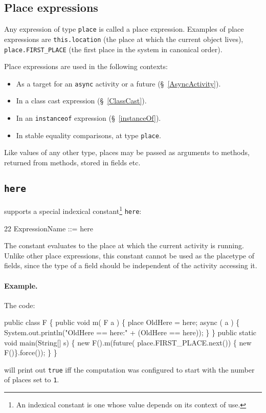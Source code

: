 \cbend
\subsection{Place expressions}
Any expression of type {\tt place} is called a place expression. 
Examples of place expressions are {\tt this.location} (the place
at which the current object lives), {\tt place.FIRST\_PLACE}
(the first place in the system in canonical order). 

Place expressions are used in the following contexts: 
\begin{itemize}
\item As a target for an {\tt async} activity or a future
(\S~\ref{AsyncActivity}).
\item In a class cast expression  (\S~\ref{ClassCast}).
\item In an {\tt instanceof} expression (\S~\ref{instanceOf}).
\item In stable equality comparisons, at type {\tt place}.
\end{itemize}

Like values of any other type, places may be passed as arguments
to methods, returned from methods, stored in fields etc.

\subsection{{\tt here}}\label{Here}
\Xten{} supports a special indexical constant\footnote{
An indexical constant is one whose value depends on its context of use.}
  {\tt here}:
\begin{x10}
22 ExpressionName ::= here
\end{x10}
The constant evaluates to the place at which the current activity is
running. Unlike other place expressions, this constant cannot be 
used as the placetype of fields, since the type of a field 
should be independent of the activity accessing it.

\paragraph{Example.}
The code:
\begin{x10}
public class F \{
   public void m( F a ) \{
     place OldHere = here;
     async ( a ) \{
      System.out.println("OldHere == here:" 
                         + (OldHere == here));
     \}
   \}
  public static void main(String[] s) \{
     new F().m(future( place.FIRST\_PLACE.next())
                \{ new F()\}.force());
  \}
\}  
\end{x10}
\noindent will print out {\tt true} iff the computation was configured
to start with the number of places set to {\tt 1}. 

